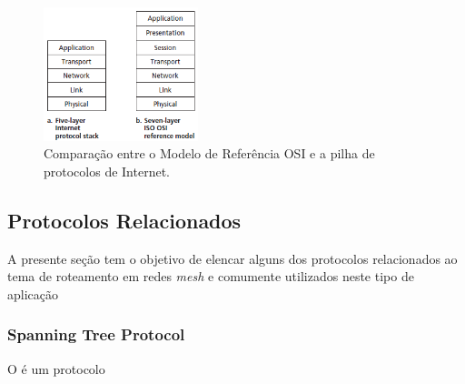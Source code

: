 \begin{figure}[!htb]
	\centering
	\includegraphics[width=0.4\textwidth]{./figuras/Modelo-OSI.png} %
	\caption[Modelo OSI]{Comparação entre o Modelo de Referência OSI e a pilha de protocolos de Internet.}
	\label{fig_modelo_OSI}
\end{figure}

\subsection{Protocolos Relacionados}
A presente seção tem o objetivo de elencar alguns dos protocolos relacionados ao tema de roteamento em redes \emph{mesh} e comumente utilizados neste tipo de aplicação

\subsubsection{Spanning Tree Protocol}
O  é um protocolo
